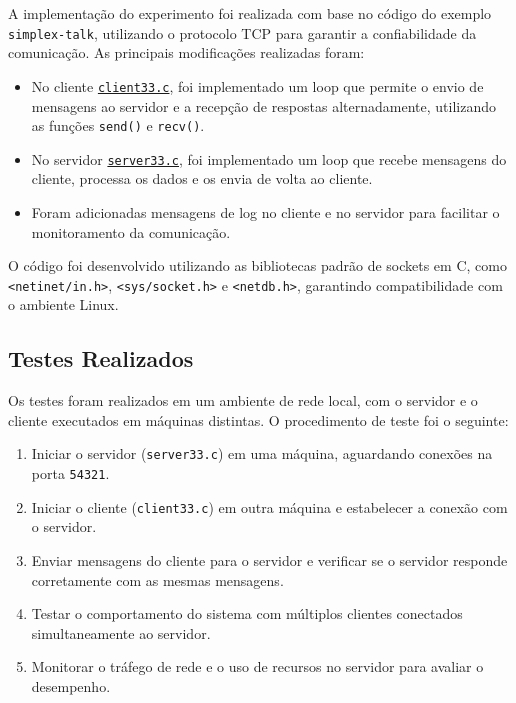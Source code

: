 \documentclass{article}
\begin{document}
A implementação do experimento foi realizada com base no código do exemplo \texttt{simplex-talk}, utilizando o protocolo TCP para garantir a confiabilidade da comunicação. As principais modificações realizadas foram:

\begin{itemize}
    \item No cliente \hyperref[lst:client2]{\texttt{client33.c}}, foi implementado um loop que permite o envio de mensagens ao servidor e a recepção de respostas alternadamente, utilizando as funções \texttt{send()} e \texttt{recv()}.
    \item No servidor \hyperref[lst:server2]{\texttt{server33.c}}, foi implementado um loop que recebe mensagens do cliente, processa os dados e os envia de volta ao cliente.
    \item Foram adicionadas mensagens de log no cliente e no servidor para facilitar o monitoramento da comunicação.\end{itemize}

O código foi desenvolvido utilizando as bibliotecas padrão de sockets em C, como \texttt{<netinet/in.h>}, \texttt{<sys/socket.h>} e \texttt{<netdb.h>}, garantindo compatibilidade com o ambiente Linux.

\subsection{Testes Realizados}

Os testes foram realizados em um ambiente de rede local, com o servidor e o cliente executados em máquinas distintas. O procedimento de teste foi o seguinte:

\begin{enumerate}
    \item Iniciar o servidor (\texttt{server33.c}) em uma máquina, aguardando conexões na porta \texttt{54321}.
    \item Iniciar o cliente (\texttt{client33.c}) em outra máquina e estabelecer a conexão com o servidor.
    \item Enviar mensagens do cliente para o servidor e verificar se o servidor responde corretamente com as mesmas mensagens.
    \item Testar o comportamento do sistema com múltiplos clientes conectados simultaneamente ao servidor.
    \item Monitorar o tráfego de rede e o uso de recursos no servidor para avaliar o desempenho.
\end{enumerate}
\end{document}
